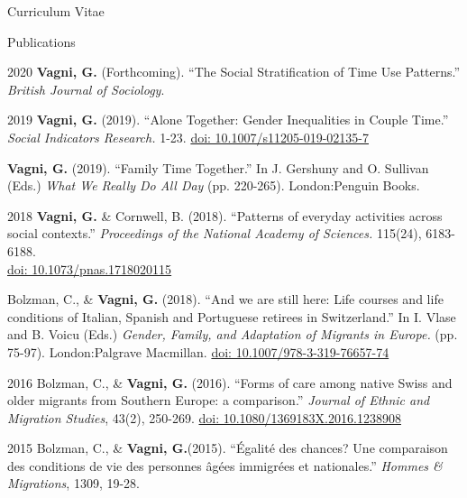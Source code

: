 \documentclass[12pt,a4paper]{article}
\begin{document}
\begin{cv}{Curriculum Vitae}
 
 \newpage
 
   \begin{cvlist}{Publications}	
   	
	\item [2020] \textbf{Vagni, G.} (Forthcoming). ``The Social Stratification of Time Use Patterns.'' \emph{British Journal of Sociology}. 
	
	 \item [2019] \textbf{Vagni, G.} (2019). ``Alone Together: Gender Inequalities in Couple Time.'' \emph{Social Indicators Research.} 1-23. \href{https://doi.org/10.1007/s11205-019-02135-7}{doi: 10.1007/s11205-019-02135-7} 
	 
		\item [] \textbf{Vagni, G.}  (2019). ``Family Time Together.'' In J. Gershuny and O. Sullivan (Eds.) \emph{What We Really Do All Day} (pp. 220-265). London:Penguin Books.  
				
		 \item [2018] \textbf{Vagni, G.} \& Cornwell, B. (2018). ``Patterns of everyday activities across social contexts.'' \emph{Proceedings of the National Academy of Sciences.} 115(24), 6183-6188. \\ \href{https://doi.org/10.1073/pnas.1718020115}{doi: 10.1073/pnas.1718020115} 
		 		  		  		    	 	 
		   \item [] Bolzman, C., \& \textbf{Vagni, G.} (2018). ``And we are still here: Life courses and life conditions of Italian, Spanish and Portuguese retirees in Switzerland.'' In I. Vlase and B. Voicu (Eds.) \emph{Gender, Family, and Adaptation of Migrants in Europe.} (pp. 75-97). London:Palgrave Macmillan. \href{https://doi.org/10.1007/978-3-319-76657-7_4}{doi: 10.1007/978-3-319-76657-74} 
  	 	    	 
   	\item [2016] Bolzman, C., \& \textbf{Vagni, G.}  (2016). ``Forms of care among native Swiss and older migrants from Southern Europe: a comparison.'' \emph{Journal of Ethnic and Migration Studies}, 43(2), 250-269. 
   	\href{https://doi.org/10.1080/1369183X.2016.1238908}{doi: 10.1080/1369183X.2016.1238908} 
   	
   	\item [2015]
   	Bolzman, C., \& \textbf{Vagni, G.}(2015). ``{\'E}galit{\'e} des chances? Une
   	comparaison des conditions de vie des personnes {\^a}g{\'e}es immigr{\'e}es
   	et nationales.'' \emph{Hommes \& Migrations}, 1309, 19-28.
   				  
   \end{cvlist}
 

\end{cv}
\end{document}
